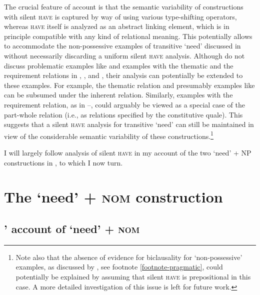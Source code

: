\documentclass[output=paper,colorlinks,citecolor=brown]{langscibook}
\begin{document}
    \largerpage[-1] %

The crucial feature of  account is that the semantic variability of constructions with silent \textsc{have} is captured by way of using various type-shifting operators, whereas \textsc{have} itself is analyzed as an abstract linking element, which is in principle compatible with any kind of relational meaning. This potentially allows to accommodate the non-possessive examples of transitive `need' discussed in  without necessarily discarding a uniform silent \textsc{have} analysis.
Although \citeauthor{Zaroukian.Beller2013} do not discuss problematic examples like  and examples with the thematic and the requirement relations in , , and , their analysis can potentially be extended to these examples. For example, the thematic relation and presumably examples like  can be subsumed under the inherent relation. Similarly, examples with the requirement relation, as in --, could arguably be viewed as a special case of the part-whole relation (i.e., as relations specified by the constitutive quale). This suggests that a silent \textsc{have} analysis for transitive `need' can still be maintained in view of the considerable semantic variability of these constructions.\footnote{Note also that the absence of evidence for biclausality for `non-possessive' examples, as discussed by \citet{Schwarz2006}, see footnote \ref{footnote-pragmatic}, could potentially be explained by assuming that silent \textsc{have} is prepositional in this case. A more detailed investigation of this issue is left for future work.\label{footnote-telic}}

I will largely follow  analysis of silent \textsc{have} in my account of the two `need' + NP constructions in , to which I now turn.

\section{The `need' + \textsc{nom} construction}\label{section-nom}

\subsection{\citeauthor{Harves2008}' account of `need' + \textsc{nom} }\label{section-harves}
\end{document}
